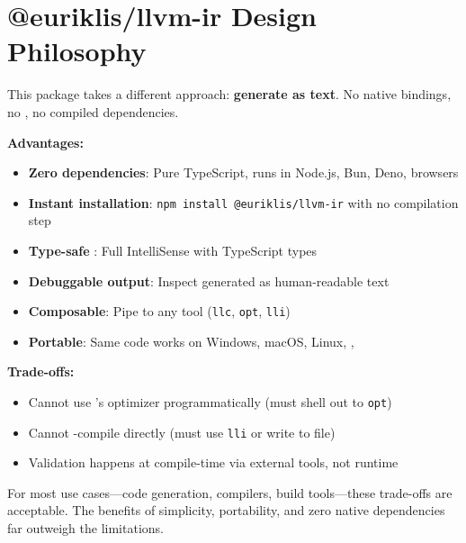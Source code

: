 \section{@euriklis/llvm-ir Design Philosophy}

This package takes a different approach: \textbf{generate   as text}. No native bindings, no , no compiled dependencies.

\textbf{Advantages:}
\begin{itemize}[noitemsep]
  \item \textbf{Zero dependencies}: Pure TypeScript, runs in Node.js, Bun, Deno, browsers
  \item \textbf{Instant installation}: \texttt{npm install @euriklis/llvm-ir} with no compilation step
  \item \textbf{Type-safe }: Full IntelliSense with TypeScript types
  \item \textbf{Debuggable output}: Inspect generated  as human-readable text
  \item \textbf{Composable}: Pipe  to any  tool (\texttt{llc}, \texttt{opt}, \texttt{lli})
  \item \textbf{Portable}: Same code works on Windows, macOS, Linux, , 
\end{itemize}

\textbf{Trade-offs:}
\begin{itemize}[noitemsep]
  \item Cannot use 's optimizer programmatically (must shell out to \texttt{opt})
  \item Cannot -compile directly (must use \texttt{lli} or write  to file)
  \item Validation happens at compile-time via external tools, not runtime
\end{itemize}

For most use cases—code generation,  compilers, build tools—these trade-offs are acceptable. The benefits of simplicity, portability, and zero native dependencies far outweigh the limitations.

